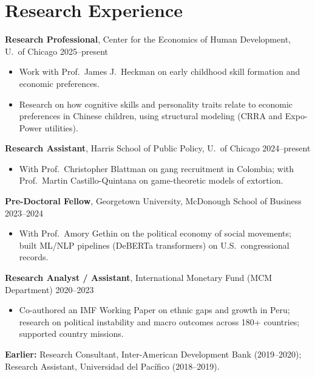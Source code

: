 \documentclass[11pt]{article}
\begin{document}
\section{Research Experience}
\textbf{Research Professional}, Center for the Economics of Human Development, U.\ of Chicago \hfill 2025--present
\begin{itemize}
\item Work with Prof.\ James J.\ Heckman on early childhood skill formation and economic preferences.
\item Research on how cognitive skills and personality traits relate to economic preferences in Chinese children, using structural modeling (CRRA and Expo-Power utilities).
\end{itemize}
\textbf{Research Assistant}, Harris School of Public Policy, U.\ of Chicago \hfill 2024--present
\begin{itemize}
\item With Prof.\ Christopher Blattman on gang recruitment in Colombia; with Prof.\ Martin Castillo-Quintana on game-theoretic models of extortion.
\end{itemize}
\textbf{Pre-Doctoral Fellow}, Georgetown University, McDonough School of Business \hfill 2023--2024
\begin{itemize}
\item With Prof.\ Amory Gethin on the political economy of social movements; built ML/NLP pipelines (DeBERTa transformers) on U.S.\ congressional records.
\end{itemize}
\textbf{Research Analyst / Assistant}, International Monetary Fund (MCM Department) \hfill 2020--2023
\begin{itemize}
\item Co-authored an IMF Working Paper on ethnic gaps and growth in Peru; research on political instability and macro outcomes across 180+ countries; supported country missions.
\end{itemize}
\textbf{Earlier:} Research Consultant, Inter-American Development Bank (2019--2020); Research Assistant, Universidad del Pacífico (2018--2019).
\end{document}
